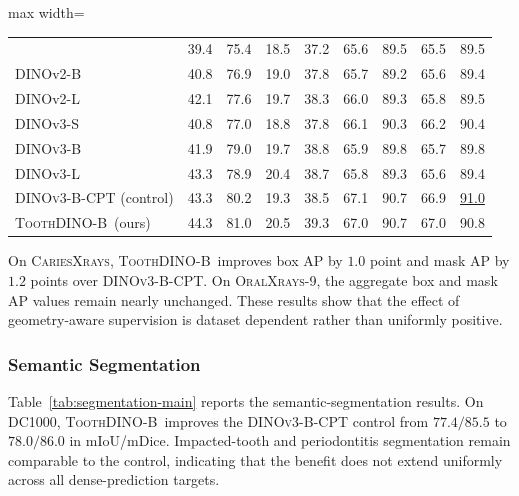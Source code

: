 \documentclass[conference]{IEEEtran}
\newcommand{\ToothDINO}{\textsc{ToothDINO}}
\newcommand{\DINOB}{\textsc{DINOv3-B}}
\newcommand{\DCT}{\textsc{DINOv3-B-CPT}}
\newcommand{\DCTControl}{\DCT{} (control)}
\newcommand{\mIoU}{\ensuremath{\mathrm{mIoU}}}
\newcommand{\mDice}{\ensuremath{\mathrm{mDice}}}
\newcommand{\dataset}[1]{\textsc{#1}}
\newcommand{\second}[1]{\underline{#1}}
\newcommand{\bk}[2]{#1~\cite{#2}}
\newcommand{\ourmethod}{\ToothDINO{}-B~}
\begin{document}
\begin{table}[t]
\begin{adjustbox}{max width=\columnwidth}
\begin{tabular}{lcccccccc}
    & 39.4 & 75.4 & 18.5 & 37.2
    & 65.6 & 89.5 & 65.5 & 89.5 \\
    \bk{DINOv2-B}{oquab2023dinov2}
    & 40.8 & 76.9 & 19.0 & 37.8
    & 65.7 & 89.2 & 65.6 & 89.4 \\
    \bk{DINOv2-L}{oquab2023dinov2}
    & 42.1 & 77.6 & 19.7 & 38.3
    & 66.0 & 89.3 & 65.8 & 89.5 \\
    \bk{DINOv3-S}{simeoni2025dinov3}
    & 40.8 & 77.0 & 18.8 & 37.8
    & 66.1 & 90.3 & 66.2 & 90.4 \\
    \bk{\DINOB{}}{simeoni2025dinov3}
    & 41.9 & 79.0 & 19.7 & 38.8
    & 65.9 & 89.8 & 65.7 & 89.8 \\
    \bk{DINOv3-L}{simeoni2025dinov3}
    & 43.3 & 78.9 & 20.4 & 38.7
    & 65.8 & 89.3 & 65.6 & 89.4 \\
    \DCTControl
    & 43.3 & 80.2 & 19.3 & 38.5
    & 67.1 & 90.7 & 66.9 & \second{91.0} \\
    \addlinespace[2pt]
    \ourmethod (ours)
    & 44.3 & 81.0 & 20.5 & 39.3
    & 67.0 & 90.7 & 67.0 & 90.8 \\
    \bottomrule
  \end{tabular}
  \end{adjustbox}
\end{table}

On \dataset{CariesXrays}, \ourmethod improves box AP by $1.0$ point and mask AP by $1.2$ points over \DCT{}. On \dataset{OralXrays-9}, the aggregate box and mask AP values remain nearly unchanged. These results show that the effect of geometry-aware supervision is dataset dependent rather than uniformly positive.

\subsubsection{Semantic Segmentation}
Table~\ref{tab:segmentation-main} reports the semantic-segmentation results. On \dataset{DC1000}, \ourmethod improves the \DCT{} control from $77.4/85.5$ to $78.0/86.0$ in \mIoU{}/\mDice{}. Impacted-tooth and periodontitis segmentation remain comparable to the control, indicating that the benefit does not extend uniformly across all dense-prediction targets.
\end{document}
